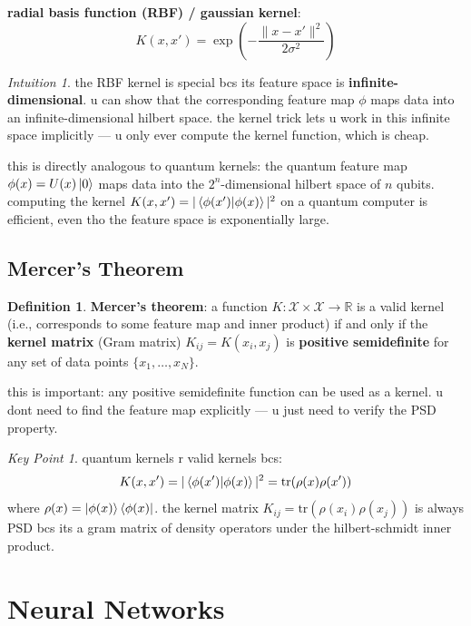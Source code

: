 \documentclass[11pt,a4paper]{article}
\theoremstyle{definition}
\newtheorem{definition}{Definition}[section]
\theoremstyle{remark}
\newtheorem*{intuition}{Intuition}
\newtheorem*{keypoint}{Key Point}
\begin{document}
\textbf{radial basis function (RBF) / gaussian kernel}:
\[
\boxed{K(x, x') = \exp\left(-\frac{\|x - x'\|^2}{2\sigma^2}\right)}
\]

\begin{intuition}
the RBF kernel is special bcs its feature space is \textbf{infinite-dimensional}. u can show that the corresponding feature map $\phi$ maps data into an infinite-dimensional hilbert space. the kernel trick lets u work in this infinite space implicitly --- u only ever compute the kernel function, which is cheap.

this is directly analogous to quantum kernels: the quantum feature map $\phi(x) = U(x)\ket{0}$ maps data into the $2^n$-dimensional hilbert space of $n$ qubits. computing the kernel $K(x, x') = |\braket{\phi(x')|\phi(x)}|^2$ on a quantum computer is efficient, even tho the feature space is exponentially large.
\end{intuition}

\subsection{Mercer's Theorem}

\begin{definition}
\textbf{Mercer's theorem}: a function $K: \mathcal{X} \times \mathcal{X} \to \mathbb{R}$ is a valid kernel (i.e., corresponds to some feature map and inner product) if and only if the \textbf{kernel matrix} (Gram matrix) $K_{ij} = K(x_i, x_j)$ is \textbf{positive semidefinite} for any set of data points $\{x_1, \ldots, x_N\}$.
\end{definition}

this is important: any positive semidefinite function can be used as a kernel. u dont need to find the feature map explicitly --- u just need to verify the PSD property.

\begin{keypoint}
quantum kernels r valid kernels bcs:
\[
K(x, x') = |\braket{\phi(x')|\phi(x)}|^2 = \text{tr}(\rho(x)\rho(x'))
\]
where $\rho(x) = \ket{\phi(x)}\bra{\phi(x)}$. the kernel matrix $K_{ij} = \text{tr}(\rho(x_i)\rho(x_j))$ is always PSD bcs its a gram matrix of density operators under the hilbert-schmidt inner product.
\end{keypoint}

\section{Neural Networks}
\end{document}
